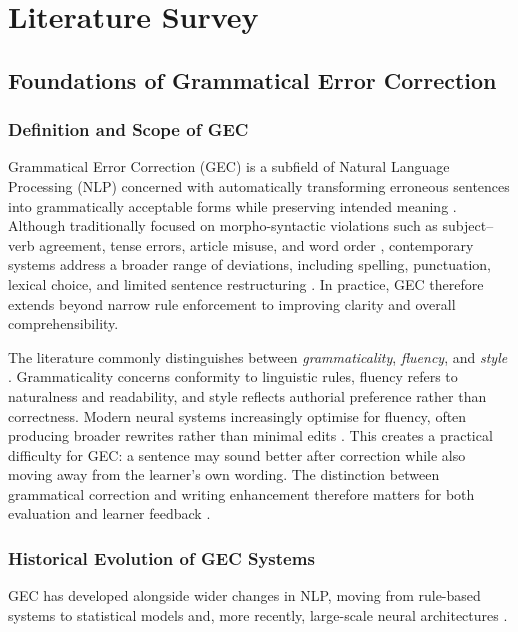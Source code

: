 \chapter{Literature Survey}

\section{Foundations of Grammatical Error Correction}

\subsection{Definition and Scope of GEC}

Grammatical Error Correction (GEC) is a subfield of Natural Language Processing (NLP) concerned with automatically transforming erroneous sentences into grammatically acceptable forms while preserving intended meaning \cite{ng-etal-2014-conll}. Although traditionally focused on morpho-syntactic violations such as subject--verb agreement, tense errors, article misuse, and word order \cite{bryant-etal-2017-automatic}, contemporary systems address a broader range of deviations, including spelling, punctuation, lexical choice, and limited sentence restructuring \cite{10.1162/coli_a_00478}. In practice, GEC therefore extends beyond narrow rule enforcement to improving clarity and overall comprehensibility.

The literature commonly distinguishes between \textit{grammaticality}, \textit{fluency}, and \textit{style} \cite{napoles-etal-2017-jfleg}. Grammaticality concerns conformity to linguistic rules, fluency refers to naturalness and readability, and style reflects authorial preference rather than correctness. Modern neural systems increasingly optimise for fluency, often producing broader rewrites rather than minimal edits \cite{loem2023exploringeffectivenessgpt3grammatical}. This creates a practical difficulty for GEC: a sentence may sound better after correction while also moving away from the learner's own wording. The distinction between grammatical correction and writing enhancement therefore matters for both evaluation and learner feedback \cite{ke2019automated}.

\subsection{Historical Evolution of GEC Systems}

GEC has developed alongside wider changes in NLP, moving from rule-based systems to statistical models and, more recently, large-scale neural architectures \cite{10.1162/coli_a_00478}.

